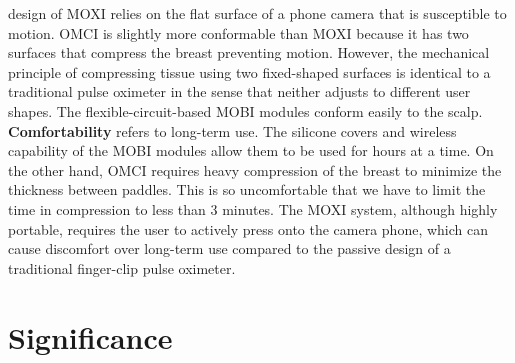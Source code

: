 design of \ac{MOXI} relies on the flat surface of a phone camera that is susceptible to motion. \ac{OMCI} is slightly more conformable than \ac{MOXI} because it has two surfaces that compress the breast preventing motion. However, the mechanical principle of compressing tissue using two fixed-shaped surfaces is identical to a traditional pulse oximeter in the sense that neither adjusts to different user shapes. The flexible-circuit-based \ac{MOBI} modules conform easily to the scalp. \textbf{Comfortability} refers to long-term use. The silicone covers and wireless capability of the \ac{MOBI} modules allow them to be used for hours at a time. On the other hand, \ac{OMCI} requires heavy compression of the breast to minimize the thickness between paddles. This is so uncomfortable that we have to limit the time in compression to less than 3 minutes. The \ac{MOXI} system, although highly portable, requires the user to actively press onto the camera phone, which can cause discomfort over long-term use compared to the passive design of a traditional finger-clip pulse oximeter. 




\section{Significance}